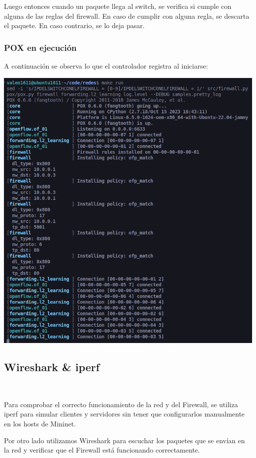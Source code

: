 \documentclass{article}
\begin{document}
Luego entonces cuando un paquete llega al switch, se verifica si cumple con alguna de las reglas del firewall. En caso de cumplir con alguna regla, se descarta el paquete. En caso contrario, se lo deja pasar. 

\subsubsection{POX en ejecución}

A continuación se observa lo que el controlador registra al iniciarse:
\begin{center}
 \includegraphics[scale=0.45]{pox_init.png}
\end{center}


\subsection{Wireshark \& iperf}\label{wireshark-iperf} \


Para comprobar el correcto funcionamiento de la red y del Firewall, se utiliza iperf para simular clientes y servidores sin tener que configurarlos manualmente en los hosts de Mininet. 

Por otro lado utilizamos Wireshark para escuchar los paquetes que se envían en la red y verificar que el Firewall está funcionando correctamente.
\end{document}
